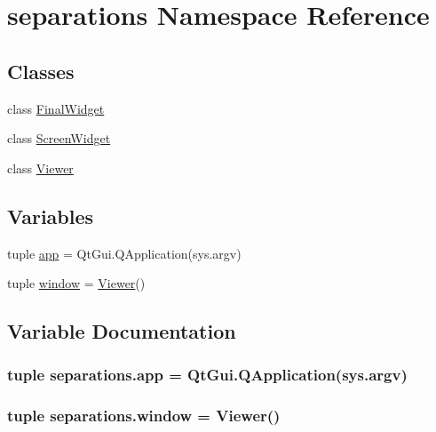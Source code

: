 \hypertarget{namespaceseparations}{}\section{separations Namespace Reference}
\label{namespaceseparations}
\subsection*{Classes}
\begin{DoxyCompactItemize}
\item 
class \hyperlink{classseparations_1_1FinalWidget}{Final\+Widget}
\item 
class \hyperlink{classseparations_1_1ScreenWidget}{Screen\+Widget}
\item 
class \hyperlink{classseparations_1_1Viewer}{Viewer}
\end{DoxyCompactItemize}
\subsection*{Variables}
\begin{DoxyCompactItemize}
\item 
tuple \hyperlink{namespaceseparations_a835540e39fedf3746936e208e5fa8fd9}{app} = Qt\+Gui.\+Q\+Application(sys.\+argv)
\item 
tuple \hyperlink{namespaceseparations_a08546cd9b66d4babf1cdfb9dcff5c30d}{window} = \hyperlink{classseparations_1_1Viewer}{Viewer}()
\end{DoxyCompactItemize}


\subsection{Variable Documentation}
\hypertarget{namespaceseparations_a835540e39fedf3746936e208e5fa8fd9}{}
\subsubsection[{app}]{\setlength{\rightskip}{0pt plus 5cm}tuple separations.\+app = Qt\+Gui.\+Q\+Application(sys.\+argv)}\label{namespaceseparations_a835540e39fedf3746936e208e5fa8fd9}
\hypertarget{namespaceseparations_a08546cd9b66d4babf1cdfb9dcff5c30d}{}
\subsubsection[{window}]{\setlength{\rightskip}{0pt plus 5cm}tuple separations.\+window = {\bf Viewer}()}\label{namespaceseparations_a08546cd9b66d4babf1cdfb9dcff5c30d}
